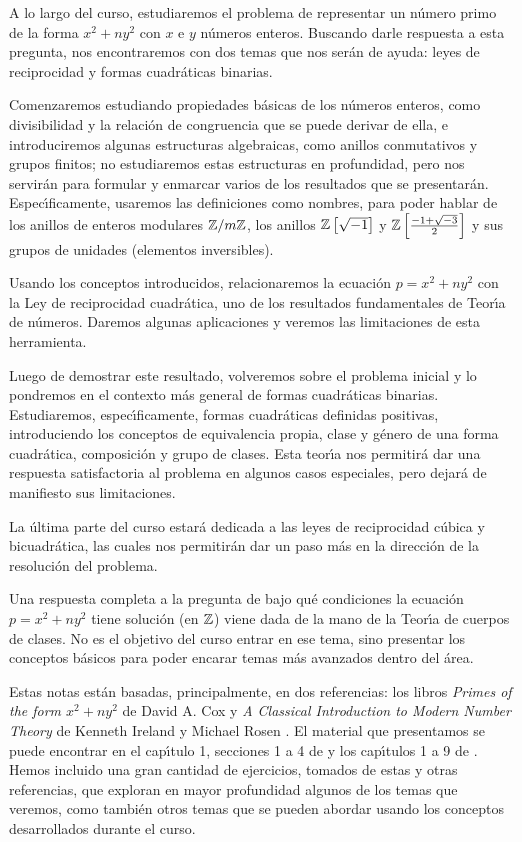 A lo largo del curso, estudiaremos el problema de representar un n\'umero
primo de la forma $x^2+ny^2$ con $x$ e $y$ n\'umeros enteros.
Buscando darle respuesta a esta pregunta, nos encontraremos con dos temas que
nos ser\'an de ayuda: leyes de reciprocidad y formas cuadr\'aticas binarias.

Comenzaremos estudiando propiedades b\'asicas de los n\'umeros enteros,
como divisibilidad y la relaci\'on de congruencia que se puede derivar de
ella, e introduciremos algunas estructuras algebraicas, como anillos
conmutativos y grupos finitos; no estudiaremos estas estructuras en
profundidad, pero nos servir\'an para formular y enmarcar varios de los
resultados que se presentar\'an. Espec\'{\i}ficamente, usaremos las
definiciones como nombres, para poder hablar de los anillos de enteros
modulares $\Enterosmod[m]$, los anillos $\polinomios[\sqrt{-1}] \Enteros$ y
$\polinomios[\frac{-1+\sqrt{-3}} 2] \Enteros$ y sus grupos de unidades
(elementos inversibles).

Usando los conceptos introducidos, relacionaremos
la ecuaci\'on $p=x^2+ny^2$ con la Ley de reciprocidad cuadr\'atica,
uno de los resultados fundamentales de Teor\'{\i}a de n\'umeros.
Daremos algunas aplicaciones y veremos las limitaciones de esta herramienta.

Luego de demostrar este resultado, volveremos sobre el problema inicial y
lo pondremos en el contexto m\'as general de formas cuadr\'aticas binarias.
Estudiaremos, espec\'{\i}ficamente, formas cuadr\'aticas definidas positivas,
introduciendo los conceptos de equivalencia propia, clase y g\'enero de una
forma cuadr\'atica, composici\'on y grupo de clases. Esta teor\'{\i}a nos
permitir\'a dar una respuesta satisfactoria al problema en algunos casos
especiales, pero dejar\'a de manifiesto sus limitaciones.

La \'ultima parte del curso estar\'a dedicada a las leyes de reciprocidad
c\'ubica y bicuadr\'atica, las cuales nos permitir\'an dar un paso m\'as en
la direcci\'on de la resoluci\'on del problema.

Una respuesta completa a la pregunta de bajo qu\'e condiciones la ecuaci\'on
$p=x^2+ny^2$ tiene soluci\'on (en $\Enteros$) viene dada de la mano de la
Teor\'{\i}a de cuerpos de clases. No es el objetivo del curso entrar en ese
tema, sino presentar los conceptos b\'asicos para poder encarar temas m\'as
avanzados dentro del \'area.

Estas notas est\'an basadas, principalmente, en dos referencias: los libros
\emph{Primes of the form $x^2+ny^2$} de David A. Cox \cite{Cox} y
\emph{A Classical Introduction to Modern Number Theory} de Kenneth Ireland y
Michael Rosen \cite{IrelandRosen}.
El material que presentamos se puede encontrar en el cap\'{\i}tulo 1,
secciones 1 a 4 de \cite{Cox} y los cap\'{\i}tulos 1 a 9 de
\cite{IrelandRosen}. Hemos incluido una gran cantidad de ejercicios,
tomados de estas y otras referencias, que exploran en mayor profundidad
algunos de los temas que veremos, como tambi\'en otros temas que se pueden
abordar usando los conceptos desarrollados durante el curso.

